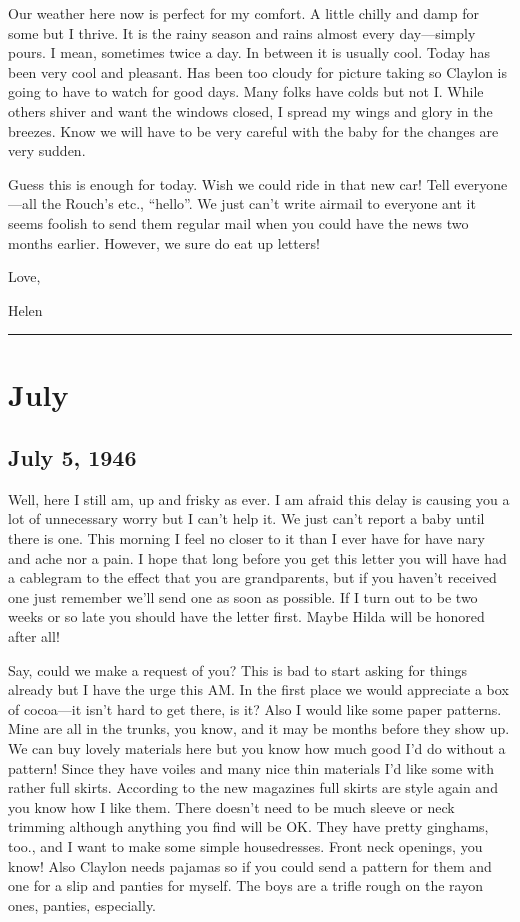 \documentclass[
]{book}
\begin{document}
Our weather here now is perfect for my comfort. A little chilly and damp for some but I thrive. It is the rainy season and rains almost every day---simply pours. I mean, sometimes twice a day. In between it is usually cool. Today has been very cool and pleasant. Has been too cloudy for picture taking so Claylon is going to have to watch for good days. Many folks have colds but not I. While others shiver and want the windows closed, I spread my wings and glory in the breezes. Know we will have to be very careful with the baby for the changes are very sudden.

Guess this is enough for today. Wish we could ride in that new car! Tell everyone---all the Rouch's etc., ``hello''. We just can't write airmail to everyone ant it seems foolish to send them regular mail when you could have the news two months earlier. However, we sure do eat up letters!

Love,

Helen

\begin{center}\rule{0.5\linewidth}{0.5pt}\end{center}

\hypertarget{july}{%
\section{July}\label{july}}

\hypertarget{july-5-1946}{%
\subsection{July 5, 1946}\label{july-5-1946}}

Well, here I still am, up and frisky as ever. I am afraid this delay is causing you a lot of unnecessary worry but I can't help it. We just can't report a baby until there is one. This morning I feel no closer to it than I ever have for have nary and ache nor a pain. I hope that long before you get this letter you will have had a cablegram to the effect that you are grandparents, but if you haven't received one just remember we'll send one as soon as possible. If I turn out to be two weeks or so late you should have the letter first. Maybe Hilda will be honored after all!

Say, could we make a request of you? This is bad to start asking for things already but I have the urge this AM. In the first place we would appreciate a box of cocoa---it isn't hard to get there, is it? Also I would like some paper patterns. Mine are all in the trunks, you know, and it may be months before they show up. We can buy lovely materials here but you know how much good I'd do without a pattern! Since they have voiles and many nice thin materials I'd like some with rather full skirts. According to the new magazines full skirts are style again and you know how I like them. There doesn't need to be much sleeve or neck trimming although anything you find will be OK. They have pretty ginghams, too., and I want to make some simple housedresses. Front neck openings, you know! Also Claylon needs pajamas so if you could send a pattern for them and one for a slip and panties for myself. The boys are a trifle rough on the rayon ones, panties, especially.
\end{document}
